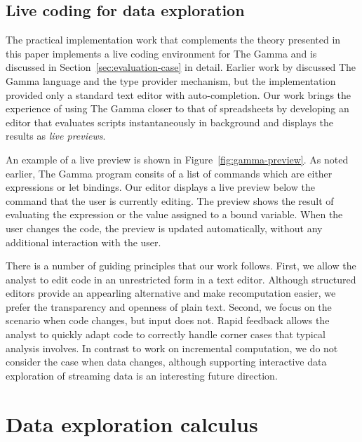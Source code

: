 \documentclass[acmsmall,anonymous,fleqn]{acmart}\settopmatter{printfolios=false,printccs=false,printacmref=false}
\theoremstyle{plain}
\theoremstyle{definition}
\begin{document}

\subsection{Live coding for data exploration}

The practical implementation work that complements the theory presented in this paper implements a live
coding environment for The Gamma and is discussed in Section~\ref{sec:evaluation-case} in detail. Earlier work by
\citet{gamma} discussed The Gamma language and the type provider mechanism, but the implementation
provided only a standard text editor with auto-completion. Our work brings the experience of using
The Gamma closer to that of spreadsheets by developing an editor that evaluates scripts
instantaneously in background and displays the results as \emph{live previews}.

An example of a live preview is shown in Figure~\ref{fig:gamma-preview}. As noted earlier, The
Gamma program consits of a list of commands which are either expressions or let bindings. Our
editor displays a live preview below the command that the user is currently editing. The preview
shows the result of evaluating the expression or the value assigned to a bound variable. When the
user changes the code, the preview is updated automatically, without any additional interaction
with the user.

There is a number of guiding principles that our work follows. First, we allow the analyst
to edit code in an unrestricted form in a text editor. Although structured editors provide an
appearling alternative and make recomputation easier, we prefer the transparency
and openness of plain text. Second, we focus on the scenario when code changes, but input
does not. Rapid feedback allows the analyst to quickly adapt code to correctly handle
corner cases that typical analysis involves. In contrast to work on incremental computation,
we do not consider the case when data changes, although supporting interactive data exploration
of streaming data is an interesting future direction.


\section{Data exploration calculus}
\label{sec:calculus}
\end{document}
